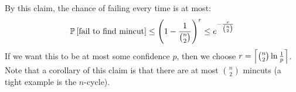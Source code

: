 \begin{algothm}
    By this claim,    
    the chance of failing every time is at most:
    \[ \mathbb{P}\left[ \text{fail to find mincut} \right] \leq \qty(1 - \frac{1}{\binom{n}{2}})^r \leq e^{-\frac{r}{\binom{n}{2}}}\]
    If we want this to be at most some confidence $p$, then we choose $r = \left\lceil \binom{n}{2} \ln \frac{1}{p} \right\rceil$.
    Note that a corollary of this claim is that there are at most $\binom{n}{2}$ mincuts (a tight example is the $n$-cycle).

\end{algothm}
